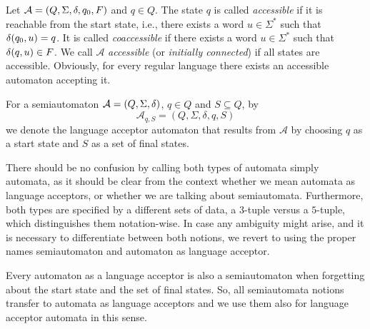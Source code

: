 Let $\mathcal A = (Q, \Sigma, \delta, q_0, F)$
and $q \in Q$. The state $q$ is called \emph{accessible} if it is reachable from the start state, i.e.,  there exists a word $u \in \Sigma^*$
such that $\delta(q_0,u) = q$. 
It is called \emph{coaccessible} if there exists a word $u \in \Sigma^*$
such that $\delta(q,u) \in F$. We call $\mathcal A$ \emph{accessible} (or \emph{initially connected}) if all states are accessible. 
Obviously, for every regular language there exists an accessible automaton accepting it.



For a semiautomaton $\mathcal A = (Q, \Sigma, \delta)$, $q \in Q$
and $S \subseteq Q$, by 
\[\mathcal A_{q,S} = (Q, \Sigma, \delta, q, S) \label{def:add_start_final}
\]
we denote the language acceptor automaton that results from $\mathcal A$ 
by choosing $q$ as a start state and $S$ as a set of final states.

There should be no confusion by calling both types of automata simply automata, as it should be clear
from the context whether we mean automata as language acceptors, or whether we are talking about 
semiautomata. Furthermore, both types are specified by a different sets of data, a $3$-tuple versus a $5$-tuple, which distinguishes them notation-wise. 
In case any ambiguity might arise, and it is necessary to differentiate between both notions,
we revert to using the proper names semiautomaton and automaton as language acceptor.

Every automaton as a language acceptor is also a semiautomaton when forgetting about the start state
and the set of final states. So, all semiautomata notions transfer to automata as language acceptors
and we use them also for language acceptor automata in this sense.

